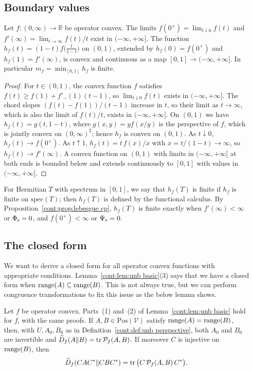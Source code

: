 \subsection{Boundary values}

\begin{lemma}\label{cont:lem:hf extended}
Let $f:(0,\infty)\to\mathbb{R}$ be operator convex. The limits $f(0^+)=\lim_{t\downarrow0}f(t)$ and $f'(\infty)=\lim_{t\to\infty}f(t)/t$ exist in $(-\infty,+\infty]$. The function $h_f(t)=(1-t)f\big(\frac{t}{1-t}\big)$ on $(0,1)$, extended by $h_f(0)=f(0^+)$ and $h_f(1)=f'(\infty)$, is convex and continuous as a map $[0,1]\to(-\infty,+\infty]$. In particular $m_f=\min_{[0,1]}h_f$ is finite.
\end{lemma}

\begin{proof}
For $t\in(0,1)$, the convex function $f$ satisfies $f(t)\geq f(1)+f'_-(1)(t-1)$, so $\lim_{t\downarrow0}f(t)$ exists in $(-\infty,+\infty]$. The chord slopes $(f(t)-f(1))/(t-1)$ increase in $t$, so their limit as $t\to\infty$, which is also the limit of $f(t)/t$, exists in $(-\infty,+\infty]$. On $(0,1)$ we have $h_f(t)=g(t,1-t)$, where $g(x,y)=yf(x/y)$ is the perspective of $f$, which is jointly convex on $(0,\infty)^2$; hence $h_f$ is convex on $(0,1)$. As $t\downarrow0$, $h_f(t)\to f(0^+)$. As $t\uparrow1$, $h_f(t)=t\,f(x)/x$ with $x=t/(1-t)\to\infty$, so $h_f(t)\to f'(\infty)$. A convex function on $(0,1)$ with limits in $(-\infty,+\infty]$ at both ends is bounded below and extends continuously to $[0,1]$ with values in $(-\infty,+\infty]$.
\end{proof}

For Hermitian $T$ with spectrum in $[0,1]$, we say that $h_f(T)$ is finite if $h_f$ is finite on $\mathrm{spec}(T)$; then $h_f(T)$ is defined by the functional calculus. By Proposition~\ref{cont:prop:lebesgue cp}, $h_f(T)$ is finite exactly when $f'(\infty)<\infty$ or $\Phi_{\rm s}=0$, and $f(0^+)<\infty$ or $\Psi_{\rm s}=0$.

\subsection{The closed form}
We want to derive a closed form for all operator convex functions with appropriate conditions. Lemma~\ref{cont:lem:unb basic}(3) says that we have a closed form when $\operatorname{range}(A)\subseteq \operatorname{range}(B)$. This is not always true, but we can perform congruence transformations to fix this issue as the below lemma shows.
\begin{lemma}\label{cont:lem:equal range}
Let $f$ be operator convex. Parts~(1) and~(2) of Lemma~\ref{cont:lem:unb basic} hold for $f$, with the same proofs. If $A,B\in\mathrm{Pos}(\mathcal{V})$ satisfy $\operatorname{range}(A)=\operatorname{range}(B)$, then, with $U,A_0,B_0$ as in Definition~\ref{cont:def:unb perspective}, both $A_0$ and $B_0$ are invertible and $\widehat{D}_f(A\|B)=\operatorname{tr}\mathcal{P}_f(A,B)$. If moreover $C$ is injective on $\operatorname{range}(B)$, then
\[
\widehat{D}_f(CAC^*\|CBC^*)=\operatorname{tr}\big(C\,\mathcal{P}_f(A,B)\,C^*\big).
\]
\end{lemma}

